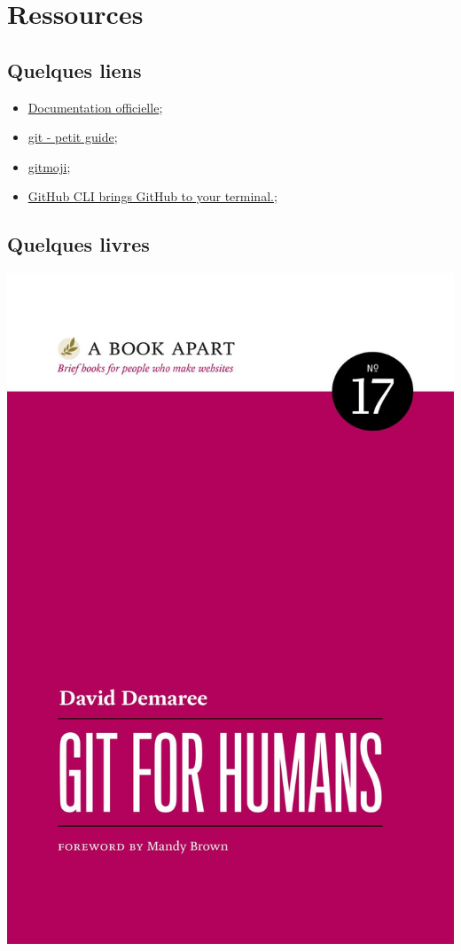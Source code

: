 \documentclass[10pt]{beamer}
\begin{document}
\section{Ressources}
\subsection{Quelques liens}
\begin{frame}{\subsecname}
    \begin{itemize}
        \item \href{https://git-scm.com/about}{Documentation officielle};
        \item \href{https://rogerdudler.github.io/git-guide/index.fr.html}{git - petit guide};
        \item \href{https://gitmoji.dev}{gitmoji};
        \item \href{https://cli.github.com}{GitHub CLI brings GitHub to your terminal.};
    \end{itemize}
\end{frame}
\subsection{Quelques livres}
\begin{frame}{\subsecname}
    \centerline{\includegraphics[height=0.8\textheight]{img/David-Demaree-GIT-FOR-HUMANS.jpg}}
\end{frame}
\end{document}
